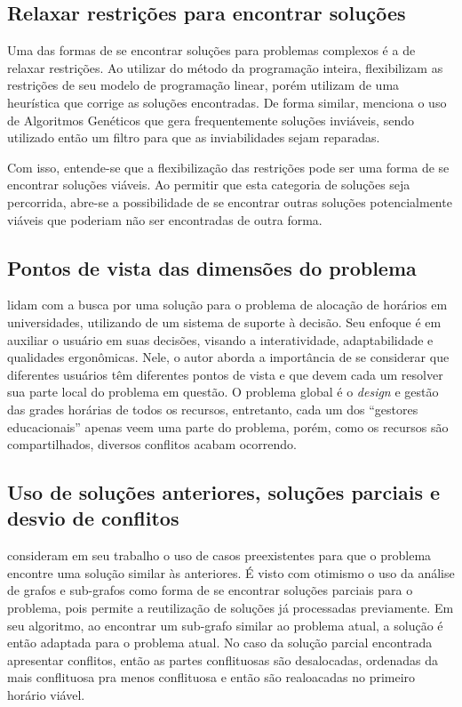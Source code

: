 \subsection{Relaxar restrições para encontrar soluções} \label{ssec:relaxar}                              %

Uma das formas de se encontrar soluções para problemas complexos é a de relaxar restrições. Ao utilizar do método da programação inteira,  flexibilizam as restrições de seu modelo de programação linear, porém utilizam de uma heurística que corrige as soluções encontradas. De forma similar,  menciona o uso de Algoritmos Genéticos que gera frequentemente soluções inviáveis, sendo utilizado então um filtro para que as inviabilidades sejam reparadas.

Com isso, entende-se que a flexibilização das restrições pode ser uma forma de se encontrar soluções viáveis. Ao permitir que esta categoria de soluções seja percorrida, abre-se a possibilidade de se encontrar outras soluções potencialmente viáveis que poderiam não ser encontradas de outra forma.

\subsection{Pontos de vista das dimensões do problema} \label{ssec:pontos}                                %

 lidam com a busca por uma solução para o problema de alocação de horários em universidades, utilizando de um sistema de suporte à decisão. Seu enfoque é em auxiliar o usuário em suas decisões, visando a interatividade, adaptabilidade e qualidades ergonômicas. Nele, o autor aborda a importância de se considerar que diferentes usuários têm diferentes pontos de vista e que devem cada um resolver sua parte local do problema em questão. O problema global é o \textit{design} e gestão das grades horárias de todos os recursos, entretanto, cada um dos ``gestores educacionais'' apenas veem uma parte do problema, porém, como os recursos são compartilhados, diversos conflitos acabam ocorrendo.

\subsection{Uso de soluções anteriores, soluções parciais e desvio de conflitos} \label{ssec:parciais}    %

 consideram em seu trabalho o uso de casos preexistentes para que o problema encontre uma solução similar às anteriores. É visto com otimismo o uso da análise de grafos e sub-grafos como forma de se encontrar soluções parciais para o problema, pois permite a reutilização de soluções já processadas previamente. Em seu algoritmo, ao encontrar um sub-grafo similar ao problema atual, a solução é então adaptada para o problema atual. No caso da solução parcial encontrada apresentar conflitos, então as partes conflituosas são desalocadas, ordenadas da mais conflituosa pra menos conflituosa e então são realoacadas no primeiro horário viável.


